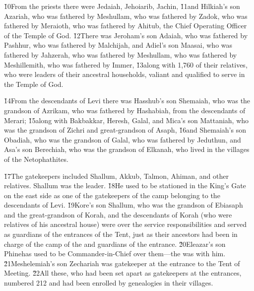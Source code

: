 \v{10}From the priests there were Jedaiah, Jehoiarib, Jachin, \v{11}and Hilkiah's son Azariah, who was fathered by Meshullam, who was fathered by Zadok, who was fathered by Meraioth, who was fathered by Ahitub, the Chief Operating Officer of the Temple of God. \v{12}There was Jeroham's son Adaiah, who was fathered by Pashhur, who was fathered by Malchijah, and Adiel's son Maasai, who was fathered by Jahzerah, who was fathered by Meshullam, who was fathered by Meshillemith, who was fathered by Immer, \v{13}along with 1,760 of their relatives, who were leaders of their ancestral households, valiant and qualified to serve in the Temple of God.

\v{14}From the descendants of Levi there was Hasshub's son Shemaiah, who was the grandson of Azrikam, who was fathered by Hashabiah, from the descendants of Merari; \v{15}along with Bakbakkar, Heresh, Galal, and Mica's son Mattaniah, who was the grandson of Zichri and great-grandson of Asaph, \v{16}and Shemaiah's son Obadiah, who was the grandson of Galal, who was fathered by Jeduthun, and Asa's son Berechiah, who was the grandson of Elkanah, who lived in the villages of the Netophathites.

\v{17}The gatekeepers included Shallum, Akkub, Talmon, Ahiman, and other relatives. Shallum was the leader. \v{18}He used to be stationed in the King's Gate on the east side as one of the gatekeepers of the camp belonging to the descendants of Levi. \v{19}Kore's son Shallum, who was the grandson of Ebiasaph and the great-grandson of Korah, and the descendants of Korah (who were relatives of his ancestral house) were over the service responsibilities and served as guardians of the entrances of the Tent, just as their ancestors had been in charge of the camp of the  and guardians of the entrance. \v{20}Eleazar's son Phinehas used to be Commander-in-Chief over them---the  was with him. \v{21}Meshelemiah's son Zechariah was gatekeeper at the entrance to the Tent of Meeting. \v{22}All these, who had been set apart as gatekeepers at the entrances, numbered 212 and had been enrolled by genealogies in their villages.

